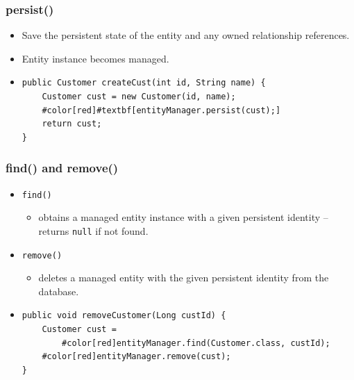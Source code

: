 \documentclass[10pt,xcolor=pdflatex]{beamer}
\begin{document}
\begin{frame}[fragile]\frametitle{persist()}
	\begin{itemize}
		\item Save the persistent state of the entity and any owned relationship references.
		\item Entity instance becomes managed.
        \medskip
        \item[] \begin{Verbatim}[fontsize=\footnotesize, commandchars=\#\[\]]
public Customer createCust(int id, String name) {
    Customer cust = new Customer(id, name);
    #color[red]#textbf[entityManager.persist(cust);]
    return cust;
}
\end{Verbatim}
	\end{itemize}
\end{frame}


\begin{frame}[fragile]\frametitle{find() and remove()}
	\begin{itemize}
		\item \texttt{find()}
          \begin{itemize}
        	\item obtains a managed entity instance with a given persistent identity -- returns \texttt{null} if not found.
          \end{itemize}
        \medskip
        \item \texttt{remove()}
          \begin{itemize}
        	\item deletes a managed entity with the given persistent identity from the database.
          \end{itemize}
        \medskip
        \item[] \begin{Verbatim}[fontsize=\footnotesize, commandchars=\#\[\]]
public void removeCustomer(Long custId) {
    Customer cust =
        #color[red]entityManager.find(Customer.class, custId);
    #color[red]entityManager.remove(cust);
}        
\end{Verbatim}
	\end{itemize}
\end{frame}
\end{document}
